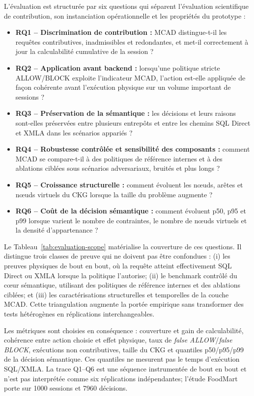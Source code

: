 \documentclass[journal]{IEEEtran}
\begin{document}
L'évaluation est structurée par six questions qui séparent l'évaluation scientifique de contribution, son instanciation opérationnelle et les propriétés du prototype :
\begin{itemize}
  \item \textbf{RQ1 -- Discrimination de contribution :} MCAD distingue-t-il les requêtes contributives, inadmissibles et redondantes, et met-il correctement à jour la calculabilité cumulative de la session ?
  \item \textbf{RQ2 -- Application avant backend :} lorsqu'une politique stricte ALLOW/BLOCK exploite l'indicateur MCAD, l'action est-elle appliquée de façon cohérente avant l'exécution physique sur un volume important de sessions ?
  \item \textbf{RQ3 -- Préservation de la sémantique :} les décisions et leurs raisons sont-elles préservées entre plusieurs entrepôts et entre les chemins SQL Direct et XMLA dans les scénarios appariés ?
  \item \textbf{RQ4 -- Robustesse contrôlée et sensibilité des composants :} comment MCAD se compare-t-il à des politiques de référence internes et à des ablations ciblées sous scénarios adversariaux, bruités et plus longs ?
  \item \textbf{RQ5 -- Croissance structurelle :} comment évoluent les nœuds, arêtes et nœuds virtuels du CKG lorsque la taille du problème augmente ?
  \item \textbf{RQ6 -- Coût de la décision sémantique :} comment évoluent p50, p95 et p99 lorsque varient le nombre de contraintes, le nombre de nœuds virtuels et la densité d'appartenance ?
\end{itemize}

Le Tableau~\ref{tab:evaluation-scope} matérialise la couverture de ces questions. Il distingue trois classes de preuve qui ne doivent pas être confondues : (i) les preuves physiques de bout en bout, où la requête atteint effectivement SQL Direct ou XMLA lorsque la politique l'autorise; (ii) le benchmark contrôlé du cœur sémantique, utilisant des politiques de référence internes et des ablations ciblées; et (iii) les caractérisations structurelles et temporelles de la couche MCAD. Cette triangulation augmente la portée empirique sans transformer des tests hétérogènes en réplications interchangeables.



Les métriques sont choisies en conséquence : couverture et gain de calculabilité, cohérence entre action choisie et effet physique, taux de \emph{false ALLOW}/\emph{false BLOCK}, exécutions non contributives, taille du CKG et quantiles p50/p95/p99 de la décision sémantique. Ces quantiles ne mesurent pas le temps d'exécution SQL/XMLA. La trace Q1--Q6 est une séquence instrumentée de bout en bout et n'est pas interprétée comme six réplications indépendantes; l'étude FoodMart porte sur 1000 sessions et 7960 décisions.
\end{document}

